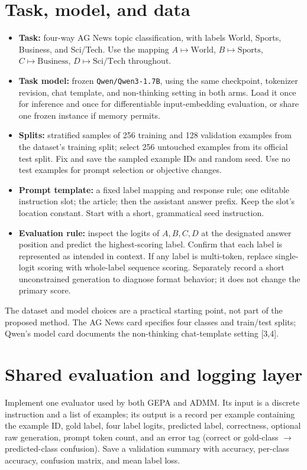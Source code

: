 \documentclass[11pt]{article}
\begin{document}
\section{Task, model, and data}
\begin{itemize}
  \item \textbf{Task:} four-way AG News topic classification, with labels World, Sports, Business, and Sci/Tech. Use the mapping $A\mapsto\text{World}$, $B\mapsto\text{Sports}$, $C\mapsto\text{Business}$, $D\mapsto\text{Sci/Tech}$ throughout.
  \item \textbf{Task model:} frozen \texttt{Qwen/Qwen3-1.7B}, using the same checkpoint, tokenizer revision, chat template, and non-thinking setting in both arms. Load it once for inference and once for differentiable input-embedding evaluation, or share one frozen instance if memory permits.
  \item \textbf{Splits:} stratified samples of 256 training and 128 validation examples from the dataset's training split; select 256 untouched examples from its official test split. Fix and save the sampled example IDs and random seed. Use no test examples for prompt selection or objective changes.
  \item \textbf{Prompt template:} a fixed label mapping and response rule; one editable instruction slot; the article; then the assistant answer prefix. Keep the slot's location constant. Start with a short, grammatical seed instruction.
  \item \textbf{Evaluation rule:} inspect the logits of $A,B,C,D$ at the designated answer position and predict the highest-scoring label. Confirm that each label is represented as intended in context. If any label is multi-token, replace single-logit scoring with whole-label sequence scoring. Separately record a short unconstrained generation to diagnose format behavior; it does not change the primary score.
\end{itemize}
The dataset and model choices are a practical starting point, not part of the proposed method. The AG News card specifies four classes and train/test splits; Qwen's model card documents the non-thinking chat-template setting [3,4].

\section{Shared evaluation and logging layer}
Implement one evaluator used by both GEPA and ADMM. Its input is a discrete instruction and a list of examples; its output is a record per example containing the example ID, gold label, four label logits, predicted label, correctness, optional raw generation, prompt token count, and an error tag (correct or gold-class $\rightarrow$ predicted-class confusion). Save a validation summary with accuracy, per-class accuracy, confusion matrix, and mean label loss.
\end{document}
